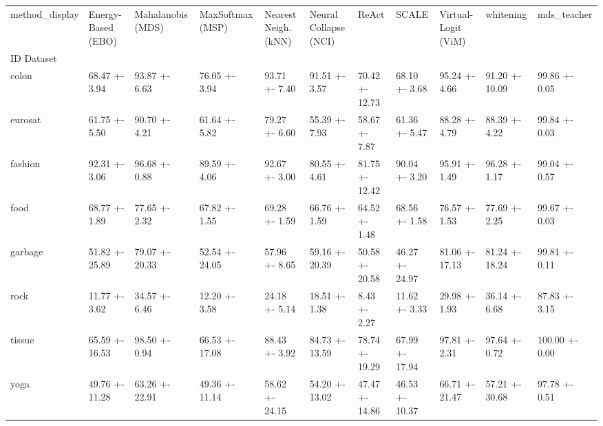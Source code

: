 \begin{tabular}{lllllllllll}
\toprule
method_display & Energy-Based (EBO) & Mahalanobis (MDS) & MaxSoftmax (MSP) & Nearest Neigh. (kNN) & Neural Collapse (NCI) & ReAct & SCALE & Virtual-Logit (ViM) & whitening & mds_teacher \\
ID Dataset &  &  &  &  &  &  &  &  &  &  \\
\midrule
colon & 68.47 +- 3.94 & 93.87 +- 6.63 & 76.05 +- 3.94 & 93.71 +- 7.40 & 91.51 +- 3.57 & 70.42 +- 12.73 & 68.10 +- 3.68 & 95.24 +- 4.66 & 91.20 +- 10.09 & 99.86 +- 0.05 \\
eurosat & 61.75 +- 5.50 & 90.70 +- 4.21 & 61.64 +- 5.82 & 79.27 +- 6.60 & 55.39 +- 7.93 & 58.67 +- 7.87 & 61.36 +- 5.47 & 88.28 +- 4.79 & 88.39 +- 4.22 & 99.84 +- 0.03 \\
fashion & 92.31 +- 3.06 & 96.68 +- 0.88 & 89.59 +- 4.06 & 92.67 +- 3.00 & 80.55 +- 4.61 & 81.75 +- 12.42 & 90.04 +- 3.20 & 95.91 +- 1.49 & 96.28 +- 1.17 & 99.04 +- 0.57 \\
food & 68.77 +- 1.89 & 77.65 +- 2.32 & 67.82 +- 1.55 & 69.28 +- 1.59 & 66.76 +- 1.59 & 64.52 +- 1.48 & 68.56 +- 1.58 & 76.57 +- 1.53 & 77.69 +- 2.25 & 99.67 +- 0.03 \\
garbage & 51.82 +- 25.89 & 79.07 +- 20.33 & 52.54 +- 24.05 & 57.96 +- 8.65 & 59.16 +- 20.39 & 50.58 +- 20.58 & 46.27 +- 24.97 & 81.06 +- 17.13 & 81.24 +- 18.24 & 99.81 +- 0.11 \\
rock & 11.77 +- 3.62 & 34.57 +- 6.46 & 12.20 +- 3.58 & 24.18 +- 5.14 & 18.51 +- 1.38 & 8.43 +- 2.27 & 11.62 +- 3.33 & 29.98 +- 1.93 & 36.14 +- 6.68 & 87.83 +- 3.15 \\
tissue & 65.59 +- 16.53 & 98.50 +- 0.94 & 66.53 +- 17.08 & 88.43 +- 3.92 & 84.73 +- 13.59 & 78.74 +- 19.29 & 67.99 +- 17.94 & 97.81 +- 2.31 & 97.64 +- 0.72 & 100.00 +- 0.00 \\
yoga & 49.76 +- 11.28 & 63.26 +- 22.91 & 49.36 +- 11.14 & 58.62 +- 24.15 & 54.20 +- 13.02 & 47.47 +- 14.86 & 46.53 +- 10.37 & 66.71 +- 21.47 & 57.21 +- 30.68 & 97.78 +- 0.51 \\
\bottomrule
\end{tabular}
